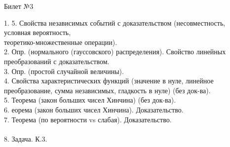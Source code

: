 \documentclass[preview]{standalone}
\begin{document}
 
\begin{center} {\Large Билет №3} \end{center} 

1. 5. Свойства независимых событий с доказательством (несовместность, условная вероятность, \\ теоретико-множественные операции).\\

2.  Опр. (нормального (гауссовского) распределения). Свойство линейных преобразований с доказательством.\\

3.  Опр. (простой случайной величины).\\

4.  Свойства характеристических функций (значение в нуле, линейное преобразование, сумма независимых, гладкость в нуле) (без док-ва).\\

5.  Теорема (закон больших чисел Хинчина) (без док-ва).\\

6. еорема (закон больших чисел Хинчина).  Доказательство.\\

7.  Теорема (по вероятности vs слабая). Доказательство. \\ \\

8. Задача. К.3.\\
\end{document}
